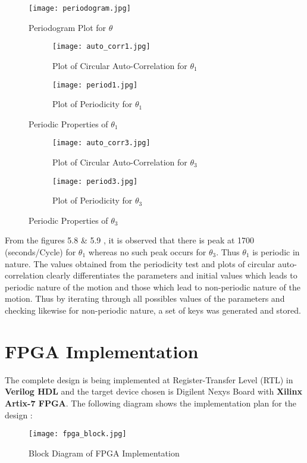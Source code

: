 \begin{figure}[H]
\centering
\texttt{[image: periodogram.jpg]}
\caption{Periodogram Plot for ${\theta}$}\label{fig:periodogram}
\end{figure}


\begin{figure}[H]
\begin{subfigure}{0.5\textwidth}
\texttt{[image: auto\_corr1.jpg]}
\caption{Plot of Circular Auto-Correlation for ${\theta_{1}}$}\label{fig:cir_auto1}
\end{subfigure}
\begin{subfigure}{0.5\textwidth}
\texttt{[image: period1.jpg]}
\caption{Plot of Periodicity for ${\theta_{1}}$}\label{fig:period1}
\end{subfigure}
\caption{Periodic Properties of ${\theta_{1}}$}\label{fig:image4}
\end{figure}

\begin{figure}[H]
\begin{subfigure}{0.5\textwidth}
\texttt{[image: auto\_corr3.jpg]}
\caption{Plot of Circular Auto-Correlation for ${\theta_{3}}$}\label{fig:cir_auto3}
\end{subfigure}
\begin{subfigure}{0.5\textwidth}
\texttt{[image: period3.jpg]}
\caption{Plot of Periodicity for ${\theta_{3}}$}\label{fig:period3}
\end{subfigure}
\caption{Periodic Properties of ${\theta_{3}}$}\label{fig:image5}
\end{figure}

From the figures 5.8 \& 5.9 , it is observed that there is peak at 1700 (seconds/Cycle) for $\theta_{1}$ whereas no such peak occurs for $\theta_{3}$. Thus $\theta_{1}$ is periodic in nature. The values obtained from the periodicity test and plots of circular auto-correlation clearly differentiates the parameters and initial values which leads to periodic nature of the motion and those which lead to non-periodic nature of the motion. Thus by iterating through all possibles values of the parameters and checking likewise for non-periodic nature, a set of keys was generated and stored. 


\section{FPGA Implementation}
The complete design is being implemented at Register-Transfer Level (RTL) in {\bf Verilog HDL} and the target device chosen is Digilent Nexys Board with {\bf Xilinx Artix-7 FPGA}. The following diagram shows the implementation plan for the design :
\begin{figure}[H]
\centering
\texttt{[image: fpga\_block.jpg]}
\caption{Block Diagram of FPGA Implementation}\label{fig:fpga_block}
\end{figure}

